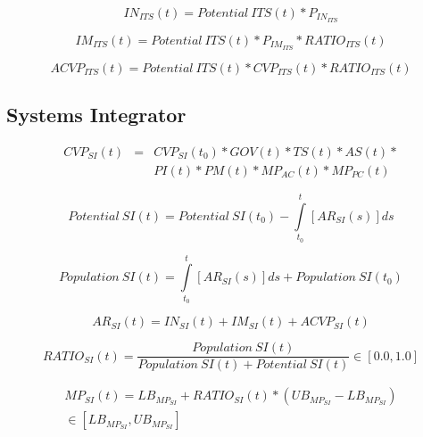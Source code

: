 \begin{equation}
		IN_{ITS}(t) = \mathit{Potential~ITS(t)} * P_{IN_{ITS}}
\end{equation}

\begin{equation}
		IM_{ITS}(t) = \mathit{Potential~ITS(t)} * P_{IM_{ITS}} * RATIO_{ITS}(t)
\end{equation}

\begin{equation}
		ACVP_{ITS}(t) = \mathit{Potential~ITS(t)} * CVP_{ITS}(t) * RATIO_{ITS}(t)
\end{equation}

\subsection{Systems Integrator}\label{ch:app04:csf:si}

\begin{eqnarray}
		CVP_{SI}(t) & = & CVP_{SI}(t_0) * GOV(t) * TS(t) * AS(t) * \nonumber \\ & & PI(t) * PM(t) * MP_{AC}(t) * MP_{PC}(t)
\end{eqnarray}

\begin{equation}
	\mathit{Potential~SI(t)} =\mathit{Potential~SI(t_0)} - \int\limits_{t_0}^t  [AR_{SI}(s)]ds
\end{equation}

\begin{equation}
	\mathit{Population~SI(t)} = \int\limits_{t_0}^t [AR_{SI}(s)]ds + \mathit{Population~SI(t_0)}
\end{equation}

\begin{equation}
		AR_{SI}(t) = IN_{SI}(t) + IM_{SI}(t) + ACVP_{SI}(t)	
\end{equation}

\begin{equation}
		RATIO_{SI}(t) = \frac{\mathit{Population~SI(t)}}{\mathit{Population~SI(t)} + \mathit{Potential~SI(t)}} \in [0.0,1.0]
\end{equation}

\begin{eqnarray}
	MP_{SI}(t) = LB_{MP_{SI}} + RATIO_{SI}(t) * (UB_{MP_{SI}} - LB_{MP_{SI}})  \nonumber \\ \in [LB_{MP_{SI}},UB_{MP_{SI}}]
\end{eqnarray}


